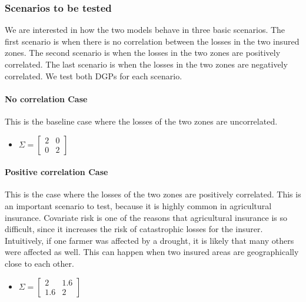 \documentclass[11pt]{article}
\begin{document}
    \subsubsection{Scenarios to be tested}
      We are interested in how the two models behave in three basic scenarios. The first scenario is when there is no correlation between the losses in the two insured zones. The second scenario is when the losses in the two zones are positively correlated. The last scenario is when the losses in the two zones are negatively correlated. We test both DGPs for each scenario. 

      \paragraph*{No correlation Case}
       This is the baseline case where the losses of the two zones are uncorrelated. 
        \begin{itemize}
            \item $\Sigma = \begin{bmatrix}
                2 & 0 \\
                0 & 2 
                \end{bmatrix} $
        \end{itemize}

      \paragraph*{Positive correlation Case}
        This is the case where the losses of the two zones are positively correlated. This is an important scenario to test, because it is highly common in agricultural insurance. Covariate risk is one of the reasons that agricultural insurance is so difficult, since it increases the risk of catastrophic losses for the insurer. Intuitively, if one farmer was affected by a drought, it is likely that many others were affected as well. This can happen when two insured areas are geographically close to each other. 
        \begin{itemize}
            \item $\Sigma = \begin{bmatrix}
                2 & 1.6 \\
                1.6 & 2 
                \end{bmatrix} $
        \end{itemize}
\end{document}
